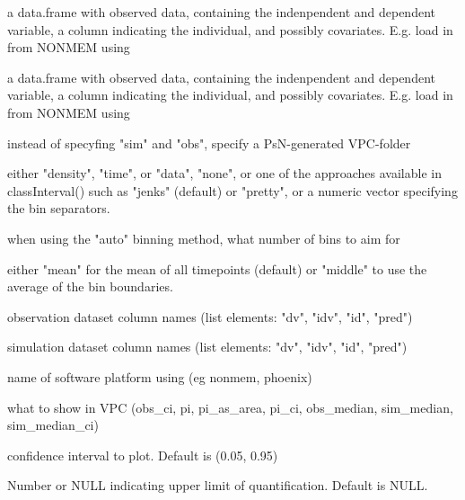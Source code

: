 \documentclass[letterpaper]{book}
\begin{document}
\begin{Arguments}
\begin{ldescription}
\item[\code{sim}] a data.frame with observed data, containing the indenpendent and dependent variable, a column indicating the individual, and possibly covariates. E.g. load in from NONMEM using 

\item[\code{obs}] a data.frame with observed data, containing the indenpendent and dependent variable, a column indicating the individual, and possibly covariates. E.g. load in from NONMEM using 

\item[\code{psn\_folder}] instead of specyfing "sim" and "obs", specify a PsN-generated VPC-folder

\item[\code{bins}] either "density", "time", or "data", "none", or one of the approaches available in classInterval() such as "jenks" (default) or "pretty", or a numeric vector specifying the bin separators.

\item[\code{n\_bins}] when using the "auto" binning method, what number of bins to aim for

\item[\code{bin\_mid}] either "mean" for the mean of all timepoints (default) or "middle" to use the average of the bin boundaries.

\item[\code{obs\_cols}] observation dataset column names (list elements: "dv", "idv", "id", "pred")

\item[\code{sim\_cols}] simulation dataset column names (list elements: "dv", "idv", "id", "pred")

\item[\code{software}] name of software platform using (eg nonmem, phoenix)

\item[\code{show}] what to show in VPC (obs\_ci, pi, pi\_as\_area, pi\_ci, obs\_median, sim\_median, sim\_median\_ci)

\item[\code{ci}] confidence interval to plot. Default is (0.05, 0.95)

\item[\code{uloq}] Number or NULL indicating upper limit of quantification. Default is NULL.


\end{ldescription}
\end{Arguments}
\end{document}
